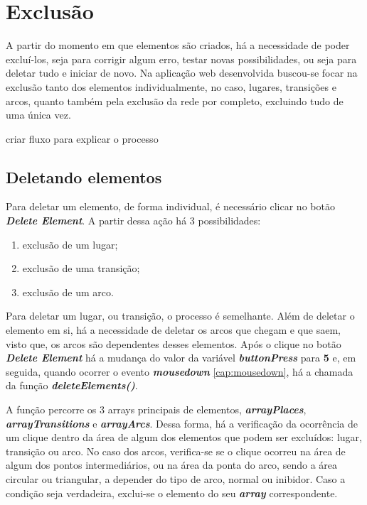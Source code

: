 \documentclass[
	12pt,				%
	openright,			%
	oneside,			%
	a4paper,			%
	english,			%
	brazil				%
	]{abntex2}
\begin{document}
\section{Exclusão}

A partir do momento em que elementos são criados, há a necessidade de poder excluí-los, seja para corrigir algum erro, testar novas possibilidades, ou seja para deletar tudo e iniciar de novo. Na aplicação web desenvolvida buscou-se focar na exclusão tanto dos elementos individualmente, no caso, lugares, transições e arcos, quanto também pela exclusão da rede por completo, excluindo tudo de uma única vez.

{\color{red}criar fluxo para explicar o processo}

\subsection*{Deletando elementos}

Para deletar um elemento, de forma individual, é necessário clicar no botão \textbf{\textit{Delete Element}}. A partir dessa ação há 3 possibilidades: 

\begin{enumerate}
	\item exclusão de um lugar;
	\item exclusão de uma transição;
	\item exclusão de um arco.
\end{enumerate}

Para deletar um lugar, ou transição, o processo é semelhante. Além de deletar o elemento em si, há a necessidade de deletar os arcos que chegam e que saem, visto que, os arcos são dependentes desses elementos. Após o clique no botão \textbf{\textit{Delete Element}} há a mudança do valor da variável \textbf{\textit{buttonPress}} para \textbf{5} e, em seguida, quando ocorrer o evento \textbf{\textit{mousedown}} \ref{cap:mousedown}, há a chamada da função \textbf{\textit{deleteElements()}}. 

A função percorre os 3 arrays principais de elementos, \textbf{\textit{arrayPlaces}}, \textbf{\textit{arrayTransitions}} e \textbf{\textit{arrayArcs}}. Dessa forma, há a verificação da ocorrência de um clique dentro da área de algum dos elementos que podem ser excluídos: lugar, transição ou arco. No caso dos arcos, verifica-se se o clique ocorreu na área de algum dos pontos intermediários, ou na área da ponta do arco, sendo a área circular ou triangular, a depender do tipo de arco, normal ou inibidor. Caso a condição seja verdadeira, exclui-se o elemento do seu \textbf{\textit{array}} correspondente.
\end{document}
